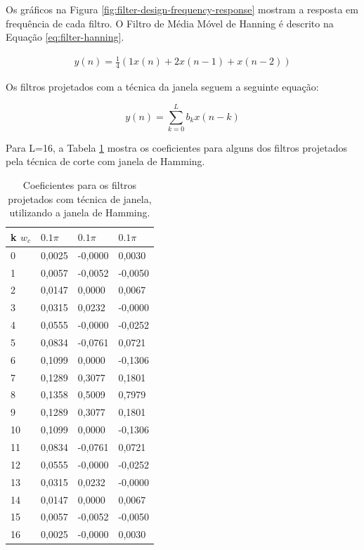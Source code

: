 Os gráficos na Figura \ref{fig:filter-design-frequency-response} mostram a
resposta em frequência de cada filtro. O Filtro de Média Móvel de Hanning é
descrito na Equação \ref{eq:filter-hanning}.

\begin{align}
\label{eq:filter-hanning}
y(n) = \frac{1}{4}(1 x(n) + 2 x(n-1) + x(n-2))
\end{align}

Os filtros projetados com a técnica da janela seguem a seguinte equação:

\begin{equation}
	y(n) = \sum_{k=0}^L b_k x(n-k)
\end{equation}

Para L=16, a Tabela \ref{tab:fir-filters-coefs} mostra os coeficientes para
alguns dos filtros projetados pela técnica de corte com janela de Hamming.

\begin{table}
\centering
\begin{tabular}{|l|l|l|l|}\hline
k \/$w_c$ & $0.1\pi$ & $0.1\pi$ & $0.1\pi$ \\ \hline
  0	& 0,0025	&   -0,0000	&		0,0030 \\		
 1	& 0,0057	&   -0,0052	&	   -0,0050 \\	
 2	& 0,0147	&    0,0000	&	    0,0067 \\	
 3	& 0,0315	&    0,0232	&	   -0,0000 \\	
 4	& 0,0555	&   -0,0000	&	   -0,0252 \\	
 5	& 0,0834	&   -0,0761	&	    0,0721 \\	
 6	& 0,1099	&    0,0000	&	   -0,1306 \\	
 7	& 0,1289	&    0,3077	&	    0,1801 \\	
 8	& 0,1358	&    0,5009	&	    0,7979 \\	
 9	& 0,1289	&    0,3077	&	    0,1801 \\	
10	& 0,1099	&    0,0000	&	   -0,1306 \\	
11	& 0,0834	&   -0,0761	&	    0,0721 \\	
12	& 0,0555	&   -0,0000	&	   -0,0252 \\	
13	& 0,0315	&    0,0232	&	   -0,0000 \\	
14	& 0,0147	&    0,0000	&	    0,0067 \\	
15	& 0,0057	&   -0,0052	&	   -0,0050 \\	
16	& 0,0025	&   -0,0000	&	    0,0030 \\
\hline
\end{tabular}

\caption{Coeficientes para os filtros projetados com técnica de janela,
utilizando a janela de Hamming.}

\label{tab:fir-filters-coefs}
\end{table}


